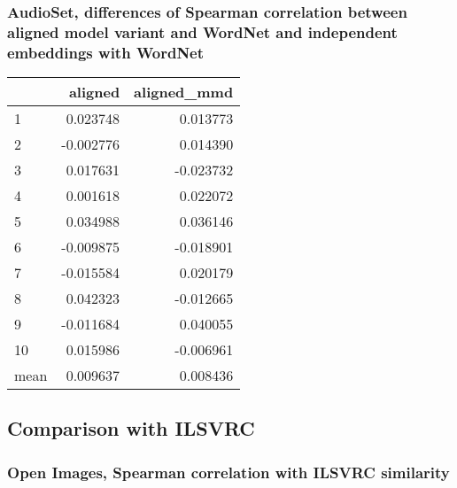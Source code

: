 \subsubsection{AudioSet, differences of Spearman correlation between aligned model variant and WordNet and independent embeddings with WordNet}

\begin{tabular}{lrr}
\toprule
{} &   aligned &  aligned\_mmd \\
\midrule
1    &  0.023748 &     0.013773 \\
2    & -0.002776 &     0.014390 \\
3    &  0.017631 &    -0.023732 \\
4    &  0.001618 &     0.022072 \\
5    &  0.034988 &     0.036146 \\
6    & -0.009875 &    -0.018901 \\
7    & -0.015584 &     0.020179 \\
8    &  0.042323 &    -0.012665 \\
9    & -0.011684 &     0.040055 \\
10   &  0.015986 &    -0.006961 \\
\midrule
mean &  0.009637 &     0.008436 \\
\bottomrule
\end{tabular}

\subsection{Comparison with ILSVRC}

\subsubsection{Open Images, Spearman correlation with ILSVRC similarity}

